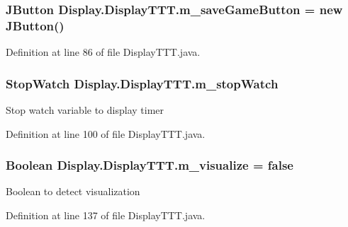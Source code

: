 \subsubsection[{m\+\_\+save\+Game\+Button}]{\setlength{\rightskip}{0pt plus 5cm}J\+Button Display.\+Display\+T\+T\+T.\+m\+\_\+save\+Game\+Button = new J\+Button()\hspace{0.3cm}{\ttfamily [private]}}\label{class_display_1_1_display_t_t_t_afbd113d4a9cd8573238108344561f62c}


Definition at line 86 of file Display\+T\+T\+T.\+java.

\hypertarget{class_display_1_1_display_t_t_t_ab640a3b08cb9f98d5a9481e45653b49f}{}
\subsubsection[{m\+\_\+stop\+Watch}]{\setlength{\rightskip}{0pt plus 5cm}Stop\+Watch Display.\+Display\+T\+T\+T.\+m\+\_\+stop\+Watch\hspace{0.3cm}{\ttfamily [private]}}\label{class_display_1_1_display_t_t_t_ab640a3b08cb9f98d5a9481e45653b49f}
Stop watch variable to display timer 

Definition at line 100 of file Display\+T\+T\+T.\+java.

\hypertarget{class_display_1_1_display_t_t_t_a92b6a913aec2926f4fdf565a4146bb31}{}
\subsubsection[{m\+\_\+visualize}]{\setlength{\rightskip}{0pt plus 5cm}Boolean Display.\+Display\+T\+T\+T.\+m\+\_\+visualize = false\hspace{0.3cm}{\ttfamily [private]}}\label{class_display_1_1_display_t_t_t_a92b6a913aec2926f4fdf565a4146bb31}
Boolean to detect visualization 

Definition at line 137 of file Display\+T\+T\+T.\+java.

\hypertarget{class_display_1_1_display_t_t_t_a06c277ab266ff9c323c13e1fd50299d2}{}
